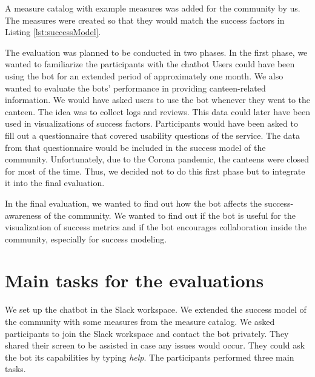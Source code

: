 A measure catalog with example measures was added for the community by us. The measures were created so that they would match the success factors in Listing \ref{lst:successModel}.

The evaluation was planned to be conducted in two phases.
In the first phase, we wanted to familiarize the participants with the chatbot
Users could have been using the bot for an extended period of approximately one month. 
We also wanted to evaluate the bots' performance in providing canteen-related information.
We would have asked users to use the bot whenever they went to the canteen. 
The idea was to collect logs and reviews. This data could later have been used in visualizations of success factors. 
Participants would have been asked to fill out a questionnaire that covered usability questions of the service. The data from that questionnaire would be included in the success model of the community.
Unfortunately, due to the Corona pandemic, the canteens were closed for most of the time. Thus, we decided not to do this first phase but to integrate it into the final evaluation.

In the final evaluation, we wanted to find out how the bot affects the success-awareness of the community.
We wanted to find out if the bot is useful for the visualization of success metrics and if the bot encourages collaboration inside the community, especially for success modeling.



\section{Main tasks for the evaluations}

We set up the chatbot in the Slack workspace. 
We extended the success model of the community with some measures from the measure catalog. 
We asked participants to join the Slack workspace and contact the bot privately. They shared their screen to be assisted in case any issues would occur. They could ask the bot its capabilities by typing \emph{help}.
The participants performed three main tasks.

